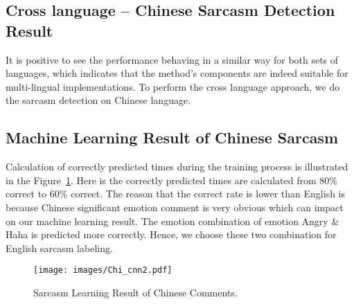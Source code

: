 \documentclass[12pt,a4paper]{report}
\theoremstyle{definition}
\begin{document}
\begin{CJK}{UTF8}{bsmi}
 
        \section{Cross language – Chinese Sarcasm Detection Result}
        \par It is positive to see the performance behaving in a similar way for both sets of languages, which indicates that the method's components are indeed suitable for multi-lingual implementations. To perform the cross language approach, we do the sarcasm detection on Chinese language.
        \subsection{Machine Learning Result of Chinese Sarcasm}
        \par Calculation of correctly predicted times during the training process is illustrated in the Figure~\ref{fig:sar_learning_chinese}. Here is the correctly predicted times are calculated from 80\% correct to 60\% correct. The reason that the correct rate is lower than English is because Chinese significant emotion comment is very obvious which can impact on our machine learning result. The emotion combination of emotion Angry \& Haha is predicted more correctly. Hence, we choose these two combination for English sarcasm labeling.
        \begin{center}
        \begin{figure}[H]
            \texttt{[image: images/Chi\_cnn2.pdf]}
            \caption{Sarcasm Learning Result of Chinese Comments.}
            \label{fig:sar_learning_chinese}
        \end{figure}
        \end{center}

\end{CJK}
\end{document}
